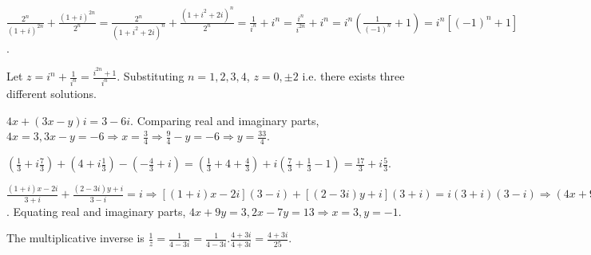 \item $\frac{2^n}{(1 + i)^{2n}} + \frac{(1 + i)^{2n}}{2^n} = \frac{2^n}{(1 + i^2 + 2i)^n} + \frac{(1 + i^2 +
  2i)^n}{2^n} = \frac{1}{i^n} + i^n = \frac{i^n}{i^{2n}} + i^n = i^n\left(\frac{1}{(-1)^n} + 1\right) =
  i^n[(-1)^n + 1]$.
\item Let $z = i^n + \frac{1}{i^n} = \frac{i^{2n} + 1}{i^n}$. Substituting $n = 1, 2, 3, 4$, $z = 0, \pm2$
  i.e. there exists three different solutions.
\item $4x + (3x - y)i = 3 - 6i$. Comparing real and imaginary parts, $4x = 3, 3x - y = -6\Rightarrow x =
  \frac{3}{4}\Rightarrow \frac{9}{4} - y = -6 \Rightarrow y = \frac{33}{4}$.
\item $\left(\frac{1}{3} + i\frac{7}{3}\right) + \left(4 + i\frac{1}{3}\right) - \left(-\frac{4}{3} +
  i\right) = \left(\frac{1}{3} + 4 + \frac{4}{3}\right) + i\left(\frac{7}{3} + \frac{1}{3} - 1\right) =
  \frac{17}{3} + i\frac{5}{3}$.
\item $\frac{(1 + i)x - 2i}{3 + i} + \frac{(2 - 3i)y + i}{3 - i} = i \Rightarrow [(1 + i)x - 2i](3 - i) +
  [(2 - 3i)y + i](3 + i) = i(3 + i)(3 - i)\Rightarrow (4x + 9y - 3) + i(2x - 7y - 3) = 10i$. Equating real
  and imaginary parts, $4x + 9y = 3, 2x - 7y = 13 \Rightarrow x = 3, y = -1$.
\item The multiplicative inverse is $\frac{1}{z} = \frac{1}{4 - 3i} = \frac{1}{4 - 3i}.\frac{4 + 3i}{4 + 3i}
  = \frac{4 + 3i}{25}$.
\stopitemize